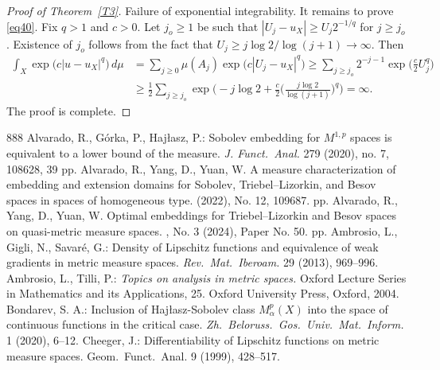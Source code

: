\documentclass[12pt,leqno]{amsart}
\theoremstyle{definition}
\numberwithin{theorem}{section} \numberwithin{equation}{section}
\begin{document}
\begin{proof}[Proof of Theorem~\ref{T3}]
\noindent
{\sc Failure of exponential integrability.}
It remains to prove \eqref{eq40}. Fix $q>1$ and $c>0$. 
Let $j_o\geq 1$ be such that  $|U_j-u_X|\geq U_j2^{-1/q}$ for $j\geq j_o$. Existence of $j_o$ follows from the fact that $U_j\geq j\log2/\log(j+1)\to\infty$. Then
\[
\begin{split}
\int_X\exp\bigl(c|u-u_X|^q\bigr)\,d\mu
&=
\sum_{j\geq0}\mu(A_j)\exp\bigl(c|U_j-u_X|^q\bigr)\geq   
\sum_{j\geq j_o} 2^{-j-1}\exp\Big(\frac{c}{2}U_j^q\Big)\\
&\geq
\frac{1}{2}\sum_{j\geq j_o} \exp\Big(-j\log 2+\frac{c}{2}\Big(\frac{j\log2}{\log(j+1)}\Big)^q\Big)=\infty.
\end{split}
\]
The proof is complete.
\end{proof}


\begin{thebibliography}{888}
%
{\sc Alvarado, R., Górka, P., Haj\l{}asz, P.:}
Sobolev embedding for $M^{1,p}$ spaces is equivalent to a lower bound of the measure. 
{\em J. Funct.\ Anal.} 279 (2020), no. 7, 108628, 39 pp. 
%
{\sc Alvarado, R., Yang, D., Yuan, W.}
\newblock A measure characterization of embedding and extension domains for {Sobolev}, {Triebel--Lizorkin}, and {Besov} spaces in spaces of homogeneous type.
 (2022), No. 12, 109687.
 pp.
%
{\sc Alvarado, R., Yang, D.,  Yuan, W.}
\newblock Optimal embeddings for {Triebel--Lizorkin} and {Besov} spaces on quasi-metric measure spaces.
, No. 3 (2024), Paper No. 50.
 pp.
%
%
{\sc Ambrosio, L., Gigli, N., Savar\'e, G.:}
Density of Lipschitz functions and equivalence of weak gradients in metric measure spaces. 
{\em Rev.\ Mat.\ Iberoam.} 29 (2013), 969--996.
%
{\sc  Ambrosio, L., Tilli, P.:}
{\em Topics on analysis in metric spaces.} 
Oxford Lecture Series in Mathematics and its Applications, 25. Oxford University Press, Oxford, 2004.
%
{\sc Bondarev, S. A.:} Inclusion of Hajłasz-Sobolev class $M^p_\alpha(X)$ into the space of continuous functions in the critical case. {\em Zh.\ Beloruss.\ Gos.\ Univ.\ Mat.\ Inform.} 1 (2020), 6--12. 
%
{\sc Cheeger, J.:} Differentiability of Lipschitz functions on metric measure spaces.
 Geom.\ Funct.\ Anal. 9 (1999), 428--517. 

\end{thebibliography}
\end{document}
